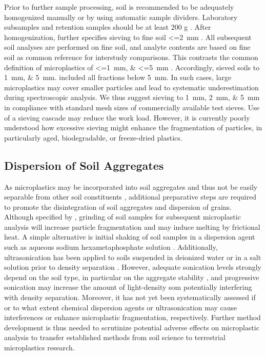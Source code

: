 Prior to further sample processing, soil is recommended to be adequately homogenized manually or by using automatic sample dividers. Laboratory subsamples and retention samples should be at least 200 g \citep{ISO11464Soil2006}. After homogenization, \citet{ISO11464Soil2006} further specifies sieving to fine soil \SI{<=2}{\milli\meter} \citep{ZubrisSynthetic2005,ZhangSimple2018}.
All subsequent soil analyses are performed on fine soil, and analyte contents are based on fine soil as common reference for interstudy comparisons.
This contrasts the common definition of microplastics of \SIlist{<=1;<=5}{\milli\meter} \citep{HartmannAre2019,BraunMicroplastics2018}.
Accordingly, \citet{PiehlIdentification2018} sieved soils to \SIlist{1;5}{\milli\meter}.  included all fractions below \SI{5}{\milli\meter}. In such cases, large microplastics may cover smaller particles and lead to systematic underestimation during spectroscopic analysis. We
thus suggest sieving to \SIlist{1;2;5}{\milli\meter} in compliance with standard mesh sizes of commercially available test sieves. Use of a sieving cascade may reduce the work load. However, it is currently poorly understood how excessive sieving might enhance the fragmentation of particles, in particularly aged, biodegradable,
or freeze-dried plastics.

\subsection{Dispersion of Soil Aggregates}
\label{sec:analytical-techniques:dispersion}

As microplastics may be incorporated into soil aggregates and thus not be easily separable from other soil constituents \citep{ZhangSimple2018},
additional preparative steps are required to promote the disintegration of soil aggregates and dispersion of grains. Although specified by \citet{ISO11464Soil2006}, grinding of soil samples for subsequent microplastic analysis will increase particle fragmentation and may induce melting by frictional heat. A simple alternative is initial shaking of soil samples in a dispersion agent such as aqueous sodium hexametaphosphate solution \citep{Garces-OrdonezMarine2019,VermaireMicroplastic2017,ZhouMicroplastics2020}. Additionally,
ultrasonication has been applied to soils suspended in deionized water \citep{ZhangDistribution2018,ZhangSimple2018} or in a salt solution prior to density separation \citep{LiuMicroplastic2018}. However, adequate sonication levels strongly depend on the soil type, in particular on the aggregate stability \citep{CerliSeparation2012}, and progressive sonication may increase the amount of light-density \ac{som} potentially interfering with density separation. Moreover, it has not yet been systematically assessed if or to what extent chemical dispersion agents or ultrasonication may cause interferences or enhance microplastic fragmentation, respectively.
Further method development is thus needed to scrutinize potential adverse effects on microplastic analysis to transfer established methods from soil science to terrestrial microplastics research.

